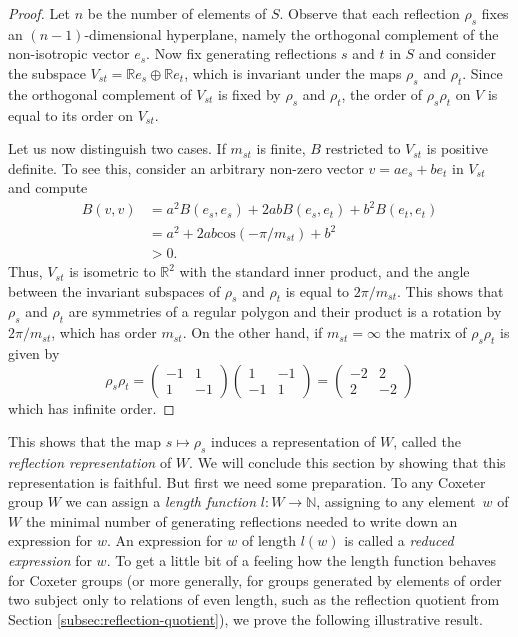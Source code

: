 \documentclass{article}
\theoremstyle{definition}
\begin{document}
\begin{proof}
Let $n$ be the number of elements of $S$. Observe that each reflection $\rho_s$ fixes an $(n-1)$-dimensional hyperplane, namely the orthogonal complement of the non-isotropic vector $e_s$. Now fix generating reflections $s$ and $t$ in $S$ and consider the subspace $V_{st} = \mathbb{R}e_s \oplus \mathbb{R}e_t$, which is invariant under the maps $\rho_s$ and $\rho_t$. Since the orthogonal complement of $V_{st}$ is fixed by $\rho_s$ and $\rho_t$, the order of $\rho_s\rho_t$ on $V$ is equal to its order on $V_{st}$.

Let us now distinguish two cases. If $m_{st}$ is finite, $B$ restricted to $V_{st}$ is positive definite. To see this, consider an arbitrary non-zero vector $v = ae_s + b e_t$ in $V_{st}$ and compute
\begin{align*}
B(v, v) & = a^2B(e_s, e_s) + 2abB(e_s, e_t) + b^2B(e_t, e_t)\\
& = a^2 + 2ab\text{cos}( -\pi / m_{st} ) + b^2 \\
& > 0.
\end{align*}
Thus, $V_{st}$ is isometric to $\mathbb{R}^2$ with the standard inner product, and the angle between the invariant subspaces of $\rho_s$ and $\rho_t$ is equal to $2 \pi / m_{st}$. This shows that $\rho_s$ and $\rho_t$ are symmetries of a regular polygon and their product is a rotation by $2\pi/m_{st}$, which has order $m_{st}$.
On the other hand, if $m_{st} = \infty$ the matrix of $\rho_s\rho_t$ is given by
$$\rho_s \rho_t = \left( \begin{matrix}
-1 & 1 \\ 1 & -1
\end{matrix} \right)
\left( \begin{matrix}
1 & -1 \\ -1 & 1
\end{matrix} \right)
= \left( \begin{matrix}
-2 & 2 \\ 2 & -2
\end{matrix} \right)
$$
which has infinite order.
\end{proof}

This shows that the map $s \mapsto \rho_s$ induces a representation of $W$, called the \textit{reflection representation} of $W$. We will conclude this section by showing that this representation is faithful. But first we need some preparation.
To any Coxeter group $W$ we can assign a \textit{length function} $l: W \rightarrow \mathbb{N}$, assigning to any element~$w$ of $W$ the minimal number of generating reflections needed to write down an expression for $w$. An expression for $w$ of length $l(w)$ is called a \textit{reduced expression} for $w$.
To get a little bit of a feeling how the length function behaves for Coxeter groups (or more generally, for groups generated by elements of order two subject only to relations of even length, such as the reflection quotient from Section \ref{subsec:reflection-quotient}), we prove the following illustrative result.
\end{document}
